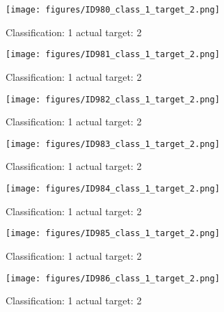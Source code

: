 \begin{figure}[h!]
\begin{center}
\texttt{[image: figures/ID980\_class\_1\_target\_2.png]}
\end{center}
\caption{ Classification: 1 actual target: 2}
\label{fig:ID980_class_1_target_2}
\end{figure}
\begin{figure}[h!]
\begin{center}
\texttt{[image: figures/ID981\_class\_1\_target\_2.png]}
\end{center}
\caption{ Classification: 1 actual target: 2}
\label{fig:ID981_class_1_target_2}
\end{figure}
\begin{figure}[h!]
\begin{center}
\texttt{[image: figures/ID982\_class\_1\_target\_2.png]}
\end{center}
\caption{ Classification: 1 actual target: 2}
\label{fig:ID982_class_1_target_2}
\end{figure}
\begin{figure}[h!]
\begin{center}
\texttt{[image: figures/ID983\_class\_1\_target\_2.png]}
\end{center}
\caption{ Classification: 1 actual target: 2}
\label{fig:ID983_class_1_target_2}
\end{figure}
\begin{figure}[h!]
\begin{center}
\texttt{[image: figures/ID984\_class\_1\_target\_2.png]}
\end{center}
\caption{ Classification: 1 actual target: 2}
\label{fig:ID984_class_1_target_2}
\end{figure}
\begin{figure}[h!]
\begin{center}
\texttt{[image: figures/ID985\_class\_1\_target\_2.png]}
\end{center}
\caption{ Classification: 1 actual target: 2}
\label{fig:ID985_class_1_target_2}
\end{figure}
\begin{figure}[h!]
\begin{center}
\texttt{[image: figures/ID986\_class\_1\_target\_2.png]}
\end{center}
\caption{ Classification: 1 actual target: 2}
\label{fig:ID986_class_1_target_2}
\end{figure}
